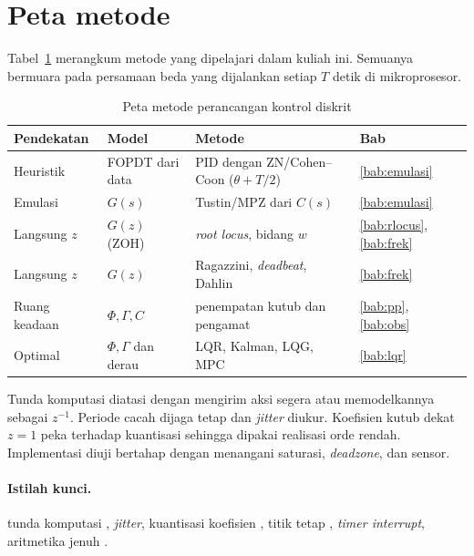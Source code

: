 \section{Peta metode}
Tabel~\ref{tab:b14-peta} merangkum metode yang dipelajari dalam kuliah ini. Semuanya bermuara pada persamaan beda yang dijalankan setiap $T$ detik di mikroprosesor.

\begin{table}[H]
	\centering
	\caption{Peta metode perancangan kontrol diskrit}
	\label{tab:b14-peta}
	\small
	\renewcommand{\arraystretch}{1.3}
	\begin{tabularx}{\textwidth}{@{}l l X l@{}}
		\toprule
		Pendekatan & Model & Metode & Bab \\
		\midrule
		Heuristik & FOPDT dari data & PID dengan ZN/Cohen--Coon ($\theta + T/2$) & \ref{bab:emulasi} \\
		Emulasi & $G(s)$ & Tustin/MPZ dari $C(s)$ & \ref{bab:emulasi} \\
		Langsung $z$ & $G(z)$ (ZOH) & \textit{root locus}, bidang $w$ & \ref{bab:rlocus}, \ref{bab:frek} \\
		Langsung $z$ & $G(z)$ & Ragazzini, \textit{deadbeat}, Dahlin & \ref{bab:frek} \\
		Ruang keadaan & $\Phi, \Gamma, C$ & penempatan kutub dan pengamat & \ref{bab:pp}, \ref{bab:obs} \\
		Optimal & $\Phi, \Gamma$ dan derau & LQR, Kalman, LQG, MPC & \ref{bab:lqr} \\
		\bottomrule
	\end{tabularx}
\end{table}

\begin{ringkasan}
	Tunda komputasi diatasi dengan mengirim aksi segera atau memodelkannya sebagai $z^{-1}$. Periode cacah dijaga tetap dan \textit{jitter} diukur. Koefisien kutub dekat $z = 1$ peka terhadap kuantisasi sehingga dipakai realisasi orde rendah. Implementasi diuji bertahap dengan menangani saturasi, \textit{deadzone}, dan sensor.\\[3pt]
\end{ringkasan}

\paragraph{Istilah kunci.} tunda komputasi , \textit{jitter}, kuantisasi koefisien , titik tetap , \textit{timer interrupt}, aritmetika jenuh .

